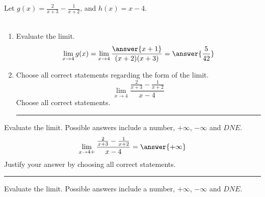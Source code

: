 \documentclass{ximera}
\author{Nela Lakos}
\begin{document}
\begin{exercise}
Let $g(x) = \frac{2}{x+3}-\frac{1}{x+2}$, and $h(x) = x-4$.\\\\

\begin{enumerate}
\item Evaluate the limit.
\[
\lim_{x\to4}g(x) = \lim_{x\to4}\dfrac{\answer{x+1}}{(x+2)(x+3)}=\answer{\frac{5}{42}}
\]

\item Choose all correct statements regarding  the form of the limit. 
\[
\lim_{x\to4}\dfrac{ \frac{2}{x+3}-\frac{1}{x+2}}{x-4}
\]
Choose all correct statements.
\begin{selectAll} 
\end{selectAll}
\noindent\rule[0.5ex]{\linewidth}{0.2pt}
\end{enumerate}
\begin{exercise}
 Evaluate the limit. Possible answers include a number, $+\infty$, $-\infty$ and $DNE$.
\[
\lim_{x\to4+}\dfrac{ \frac{2}{x+3}-\frac{1}{x+2}}{x-4}=\answer{+\infty}
\]
 Justify your answer  by choosing all correct statements.
 \begin{selectAll} 
\end{selectAll}
\noindent\rule[0.5ex]{\linewidth}{0.2pt}
\begin{exercise}
 Evaluate the limit. Possible answers include a number, $+\infty$, $-\infty$ and $DNE$.


\end{exercise}
\end{exercise}
\end{exercise}
\end{document}
